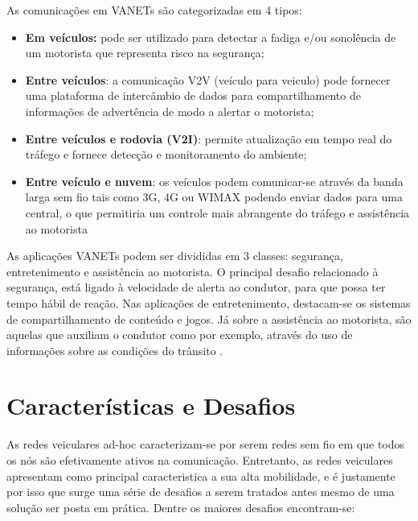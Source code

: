 \documentclass[
	12pt,				%
	oneside,			%
	a4paper,			%
	english,			%
	brazil				%
	]{abntex2ppgsi}
\begin{document}
As comunicações em VANETs são categorizadas em 4 tipos:
\begin{itemize}
	\item {\textbf{Em veículos:} pode ser utilizado para detectar a fadiga e/ou sonolência de um motorista que representa  risco na segurança;}
	\item {\textbf{Entre veículos}: a comunicação V2V (veículo para veiculo) pode fornecer uma plataforma de intercâmbio de dados para compartilhamento de informações de advertência de modo a alertar o motorista;}
	\item {\textbf{Entre veículos e rodovia (V2I)}: permite atualização em tempo real do tráfego e fornece detecção e monitoramento do ambiente;}
	\item {\textbf{Entre veículo e nuvem}: os veículos podem comunicar-se através da banda larga sem fio tais como 3G, 4G ou WIMAX podendo enviar dados para uma central, o que permitiria um controle mais abrangente do tráfego e assistência ao motorista}
\end{itemize}


As aplicações VANETs podem ser divididas em 3 classes: segurança, entretenimento e assistência ao motorista. O principal desafio relacionado à segurança, está ligado à velocidade de alerta ao condutor, para que possa ter tempo hábil de reação. Nas aplicações de entretenimento, destacam-se os sistemas de compartilhamento de conteúdo e jogos. Já sobre a assistência ao motorista, são aquelas que auxiliam o condutor como por exemplo, através do uso de informações sobre as condições do trânsito \cite{souzasoaressbrc}.

\section{Características e Desafios}


As redes veiculares ad-hoc caracterizam-se por serem redes sem fio em que todos os nós são efetivamente ativos na comunicação. Entretanto, as redes veiculares apresentam como principal caracteristica a sua alta mobilidade, e é justamente por isso que surge uma série de desafios a serem tratados antes mesmo de uma solução ser posta em prática. Dentre os maiores desafios encontram-se:
\end{document}
